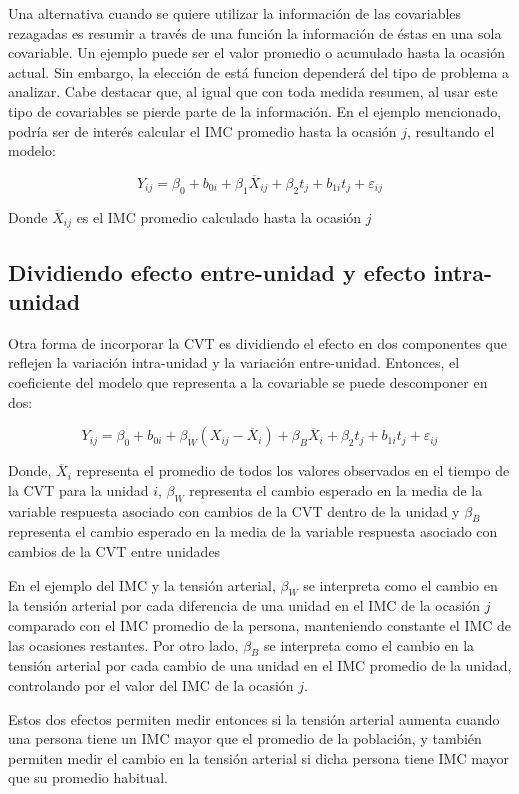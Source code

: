 \documentclass[spanish]{article}
\numberwithin{figure}{subsection}
\numberwithin{equation}{subsection}
\numberwithin{table}{subsection}
\begin{document}
Una alternativa cuando se quiere utilizar la información de las covariables
rezagadas es resumir a través de una función la información de éstas en una sola
covariable. Un ejemplo puede ser el valor promedio o acumulado hasta la ocasión
actual. Sin embargo, la elección de está funcion dependerá del tipo de problema
a analizar. Cabe destacar que, al igual que con toda medida resumen, al usar
este tipo de covariables se pierde parte de la información. En el ejemplo
mencionado, podría ser de interés calcular el IMC promedio hasta la ocasión $j$,
resultando el modelo:

\[ Y_{ij} = \beta_0 + b_{0i} + \beta_1 \overline{X}_{ij} + \beta_2 t_j + b_{1i} t_j + \varepsilon_{ij} \]

Donde $\overline{X}_{ij}$ es el IMC promedio calculado hasta la ocasión $j$

\subsection{Dividiendo efecto entre-unidad y efecto intra-unidad}
\label{Dividiendo efecto entre-unidad y efecto intra-unidad}

Otra forma de incorporar la CVT es dividiendo el efecto en dos componentes que
reflejen la variación intra-unidad y la variación entre-unidad. Entonces, el
coeficiente del modelo que representa a la covariable se puede descomponer en
dos:

\[ 
	Y_{ij} = \beta_0 + b_{0i} + \beta_W (X_{ij} - \overline{X}_i) + \beta_B
	\overline{X}_i + \beta_2 t_j + b_{1i} t_j + \varepsilon_{ij}
\]

Donde, $\overline{X}_i$ representa el promedio de todos los valores observados
en el tiempo de la CVT para la unidad $i$, $\beta_W$ representa el cambio
esperado en la media de la variable respuesta asociado con cambios de la CVT
dentro de la unidad y $\beta_B$ representa el cambio esperado en la media de
la variable respuesta asociado con cambios de la CVT entre unidades

En el ejemplo del IMC y la tensión arterial, $\beta_W$ se interpreta como el
cambio en la tensión arterial por cada diferencia de una unidad en el IMC de la
ocasión $j$ comparado con el IMC promedio de la persona, manteniendo constante
el IMC de las ocasiones restantes. Por otro lado, $\beta_B$ se interpreta como
el cambio en la tensión arterial por cada cambio de una unidad en el IMC
promedio de la unidad, controlando por el valor del IMC de la ocasión $j$.

Estos dos efectos permiten medir entonces si la tensión arterial aumenta cuando
una persona tiene un IMC mayor que el promedio de la población, y también
permiten medir el cambio en la tensión arterial si dicha persona tiene IMC mayor
que su promedio habitual.
\end{document}

